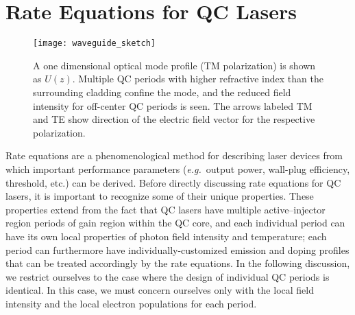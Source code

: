 {%

\section{Rate Equations for QC Lasers}

\begin{figure}[tp]
\centering
\texttt{[image: waveguide\_sketch]}
\caption[Sketch of waveguide geometry]{ A one dimensional optical mode profile (TM polarization) is shown as $U(z)$.  Multiple QC periods with higher refractive index than the surrounding cladding confine the mode, and the reduced field intensity for off-center QC periods is seen.  The arrows labeled TM and TE show direction of the electric field vector for the respective polarization.}
\label{chpt1:wg_sketch}
\end{figure}

Rate equations are a phenomenological method for describing laser devices from which important performance parameters (\emph{e.g.}\ output power, wall-plug efficiency, threshold, etc.) can be derived.  Before directly discussing rate equations for QC lasers, it is important to recognize some of their unique properties.  These properties extend from the fact that QC lasers have multiple active--injector region periods of gain region within the QC core, and each individual period can have its own local properties of photon field intensity and temperature; each period can furthermore have individually-customized emission \cite{Gmachl:2002:Nature:broadband} and doping profiles \cite{Hoffman:OptExp:2007} that can be treated accordingly by the rate equations. In the following discussion, we restrict ourselves to the case where the design of individual QC periods is identical.  In this case, we must concern ourselves only with the local field intensity and the local electron populations for each period.

}
